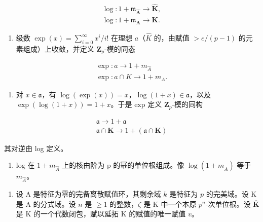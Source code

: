 \[
\begin{array}{l} \log : 1 + \mathfrak {m} _ {\hat {\mathbf {A}}} \to \hat {\mathbf {K}}, \\ \log : 1 + \mathfrak {m} _ {\mathbf {A}} \to \mathbf {K}. \end{array}
\]

\begin{enumerate}
\def\labelenumi{\alph{enumi})}
\setcounter{enumi}{1}
\tightlist
\item
  级数 \(\exp(x) = \sum_{i=0}^{\infty} x^{i}/i!\) 在理想 \(a\)（\(\hat{K}\) 的，由赋值 \(>e/(p-1)\) 的元素组成）上收敛，并定义 \(\mathbf{Z}_{p}\)-模的同态
\end{enumerate}

\[
\begin{array}{l} \exp : a \to 1 + m _ {\hat {A}} \\ \exp : a \cap K \to 1 + m _ {A}. \end{array}
\]

\begin{enumerate}
\def\labelenumi{\alph{enumi})}
\setcounter{enumi}{2}
\tightlist
\item
  对 \(x \in \mathfrak{a}\)，有 \(\log(\exp(x)) = x\)，\(\log(1 + x) \in \mathfrak{a}\)，以及 \(\exp(\log(1 + x)) = 1 + x\)。于是 exp 定义 \(\mathbf{Z}_p\)-模的同构
\end{enumerate}

\[
\begin{array}{l}\mathfrak {a} \rightarrow 1 + \mathfrak {a}\\\mathfrak {a} \cap \mathbf {K} \rightarrow 1 + (\mathfrak {a} \cap \mathbf {K})\end{array}
\]

其对逆由 log 定义。

\begin{enumerate}
\def\labelenumi{\alph{enumi})}
\setcounter{enumi}{3}
\tightlist
\item
  log 在 \(1 + m_{\hat{A}}\) 上的核由阶为 p 的幂的单位根组成。像 \(\log(1 + m_{\hat{A}})\) 等于 \(m_{\hat{A}}\)。
\end{enumerate}

\begin{enumerate}
\def\labelenumi{\arabic{enumi})}
\setcounter{enumi}{13}
\tightlist
\item
  设 A 是特征为零的完备离散赋值环，其剩余域 \(k\) 是特征为 \(p\) 的完美域。设 K 是 A 的分式域。设 \(n\) 是 \(\geqslant 1\) 的整数，\(\zeta\) 是 K 中一个本原 \(p^n\)-次单位根。设 \(\overline{\mathbf{K}}\) 是 K 的一个代数闭包，赋以延拓 K 的赋值的唯一赋值 \(v\)。
\end{enumerate}


